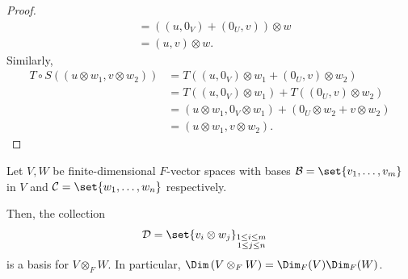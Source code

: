 \documentclass[10pt]{mypackage}
\begin{document}
\begin{proof}
\begin{align*}
                                                     &= \left(\left(u,0_V\right) + \left(0_U,v\right)\right)\otimes w\\
                                                     &= \left(u,v\right)\otimes w.
    \end{align*}
    Similarly,
    \begin{align*}
      T\circ S\left(\left(u\otimes w_1,v\otimes w_2\right)\right) &= T\left(\left(u,0_V\right)\otimes w_1 + \left(0_U,v\right)\otimes w_2\right)\\
                                                                  &= T\left(\left(u,0_V\right)\otimes w_1\right) + T\left(\left(0_U,v\right)\otimes w_2\right)\\
                                                                  &= \left(u\otimes w_1,0_V\otimes w_1 \right) + \left(0_U\otimes w_2 + v\otimes w_2\right)\\
                                                                  &= \left(u\otimes w_1,v\otimes w_2\right).
    \end{align*}
    
  \end{proof}
  \begin{corollary}
    Let $V,W$ be finite-dimensional $F$-vector spaces with bases $\mathcal{B} = \set{v_1,\dots,v_m}$ in $V$ and $\mathcal{C} = \set{w_1,\dots,w_n}$ respectively.\newline

    Then, the collection
    \begin{align*}
      \mathcal{D} &= \set{v_{i}\otimes w_j}_{\substack{1\leq i \leq m\\ 1\leq j \leq n}}
    \end{align*}
    is a basis for $V\otimes_{F} W$. In particular, $\Dim\left(V\otimes_{F} W\right) = \Dim_{F}(V)\Dim_{F}(W)$.
  \end{corollary}
\end{document}
